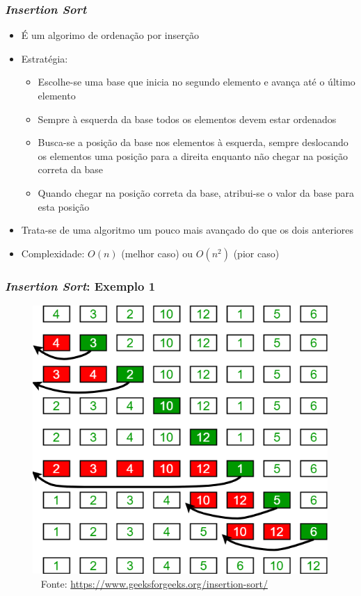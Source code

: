 \documentclass[aspectratio=169]{beamer}
\begin{document}
\begin{frame}\frametitle{\emph{Insertion Sort}}
\begin{itemize}
	\item É um algorimo de ordenação por inserção
	\item Estratégia:
	\begin{itemize}
		\item Escolhe-se uma base que inicia no segundo elemento e avança até o último elemento
		\item Sempre à esquerda da base todos os elementos devem estar ordenados
		\item Busca-se a posição da base nos elementos à esquerda, sempre deslocando os elementos uma posição para a direita enquanto não chegar na posição correta da base
		\item Quando chegar na posição correta da base, atribui-se o valor da base para esta posição
	\end{itemize}
	\item Trata-se de uma algoritmo um pouco mais avançado do que os dois anteriores
	\item Complexidade: $O(n)$ (melhor caso) ou $O(n^2)$ (pior caso)
\end{itemize}
\end{frame}	

\begin{frame}\frametitle{\emph{Insertion Sort}: Exemplo 1}
\begin{figure}[h]
	\centering
	\includegraphics[height=0.6\paperheight]{imagens/insertion_sort.png}\\
	~ {\tiny Fonte: \url{https://www.geeksforgeeks.org/insertion-sort/}}
\end{figure}
\end{frame}
\end{document}
